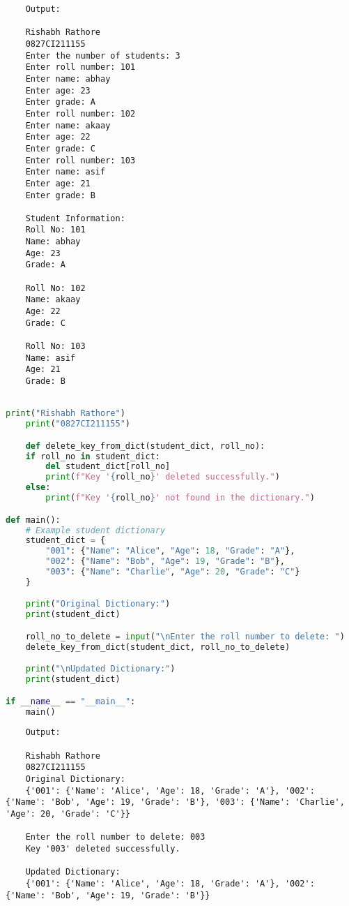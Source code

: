 \documentclass{report}
\begin{document}
\begin{verbatim}
	Output:

	Rishabh Rathore
	0827CI211155
	Enter the number of students: 3
	Enter roll number: 101
	Enter name: abhay
	Enter age: 23
	Enter grade: A
	Enter roll number: 102
	Enter name: akaay
	Enter age: 22
	Enter grade: C
	Enter roll number: 103
	Enter name: asif
	Enter age: 21
	Enter grade: B
	
	Student Information:
	Roll No: 101
	Name: abhay
	Age: 23
	Grade: A
	
	Roll No: 102
	Name: akaay
	Age: 22
	Grade: C
	
	Roll No: 103
	Name: asif
	Age: 21
	Grade: B
	

\end{verbatim}

\newpage


\sol 
\begin{lstlisting}[language=Python]
	print("Rishabh Rathore")
	print("0827CI211155")

	def delete_key_from_dict(student_dict, roll_no):
    if roll_no in student_dict:
        del student_dict[roll_no]
        print(f"Key '{roll_no}' deleted successfully.")
    else:
        print(f"Key '{roll_no}' not found in the dictionary.")

def main():
    # Example student dictionary
    student_dict = {
        "001": {"Name": "Alice", "Age": 18, "Grade": "A"},
        "002": {"Name": "Bob", "Age": 19, "Grade": "B"},
        "003": {"Name": "Charlie", "Age": 20, "Grade": "C"}
    }

    print("Original Dictionary:")
    print(student_dict)

    roll_no_to_delete = input("\nEnter the roll number to delete: ")
    delete_key_from_dict(student_dict, roll_no_to_delete)

    print("\nUpdated Dictionary:")
    print(student_dict)

if __name__ == "__main__":
    main()

\end{lstlisting}

\begin{verbatim}
	Output:

	Rishabh Rathore
	0827CI211155
	Original Dictionary:
	{'001': {'Name': 'Alice', 'Age': 18, 'Grade': 'A'}, '002': {'Name': 'Bob', 'Age': 19, 'Grade': 'B'}, '003': {'Name': 'Charlie', 'Age': 20, 'Grade': 'C'}}

	Enter the roll number to delete: 003
	Key '003' deleted successfully.

	Updated Dictionary:
	{'001': {'Name': 'Alice', 'Age': 18, 'Grade': 'A'}, '002': {'Name': 'Bob', 'Age': 19, 'Grade': 'B'}}
	

\end{verbatim}
\end{document}
